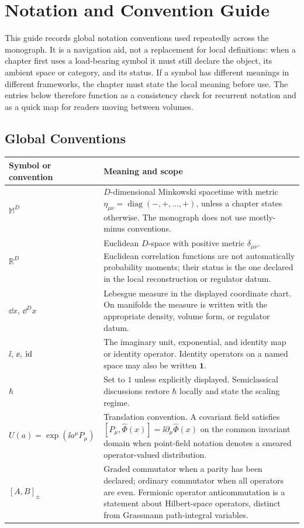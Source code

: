 \chapter*{Notation and Convention Guide}
\label{ch:notation-convention-guide}

This guide records global notation conventions used repeatedly across the
monograph.  It is a navigation aid, not a replacement for local definitions:
when a chapter first uses a load-bearing symbol it must still declare the
object, its ambient space or category, and its status.  If a symbol has
different meanings in different frameworks, the chapter must state the local
meaning before use.  The entries below therefore function as a consistency
check for recurrent notation and as a quick map for readers moving between
volumes.

\section*{Global Conventions}

\begin{longtable}{>{\raggedright\arraybackslash}p{}
                  >{\raggedright\arraybackslash}p{}}
\hline
\textbf{Symbol or convention} & \textbf{Meaning and scope}\\
\hline
\endhead
\(\mathbb M^D\) &
\(D\)-dimensional Minkowski spacetime with metric
\(\eta_{\mu\nu}=\operatorname{diag}(-,+,\ldots,+)\), unless a chapter states
otherwise.  The monograph does not use mostly-minus conventions.\\
\(\mathbb R^D\) &
Euclidean \(D\)-space with positive metric \(\delta_{\mu\nu}\).  Euclidean
correlation functions are not automatically probability moments; their status
is the one declared in the local reconstruction or regulator datum.\\
\(\dd x\), \(\dd^D x\) &
Lebesgue measure in the displayed coordinate chart.  On manifolds the measure
is written with the appropriate density, volume form, or regulator datum.\\
\(\ii\), \(\ee\), \(\mathrm{id}\) &
The imaginary unit, exponential, and identity map or identity operator.
Identity operators on a named space may also be written \(\mathbf1\).\\
\(\hbar\) &
Set to \(1\) unless explicitly displayed.  Semiclassical discussions restore
\(\hbar\) locally and state the scaling regime.\\
\(U(a)=\exp(\ii a^\mu P_\mu)\) &
Translation convention.  A covariant field satisfies
\([P_\mu,\widehat\Phi(x)]=\ii\partial_\mu\widehat\Phi(x)\) on the common
invariant domain when point-field notation denotes a smeared
operator-valued distribution.\\
\([A,B]_\pm\) &
Graded commutator when a parity has been declared; ordinary commutator when
all operators are even.  Fermionic operator anticommutation is a statement
about Hilbert-space operators, distinct from Grassmann path-integral
variables.\\
\hline
\end{longtable}

